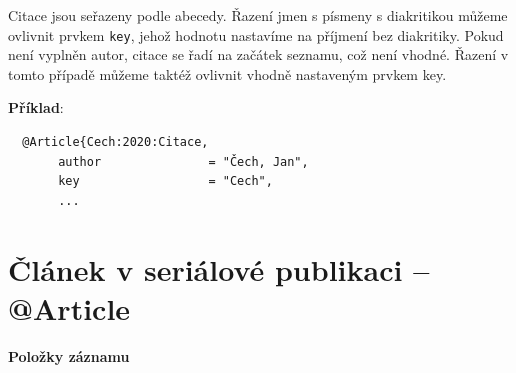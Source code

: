 Citace jsou seřazeny podle abecedy. Řazení jmen s písmeny s diakritikou můžeme ovlivnit prvkem \texttt{key}, jehož  hodnotu nastavíme na příjmení bez diakritiky. Pokud není vyplněn autor, citace se řadí na začátek seznamu, což není vhodné. Řazení v tomto případě můžeme taktéž ovlivnit vhodně nastaveným prvkem key.

\medskip
\medskip
\noindent \textbf{Příklad}:
\begin{verbatim}
  @Article{Cech:2020:Citace,
	   author               = "Čech, Jan",
	   key                  = "Cech",
	   ... 
\end{verbatim}


\newpage
\section*{Článek v seriálové publikaci -- @Article}
\label{pr-casopis-clanek}
\noindent \textbf{Položky záznamu}

\medskip

